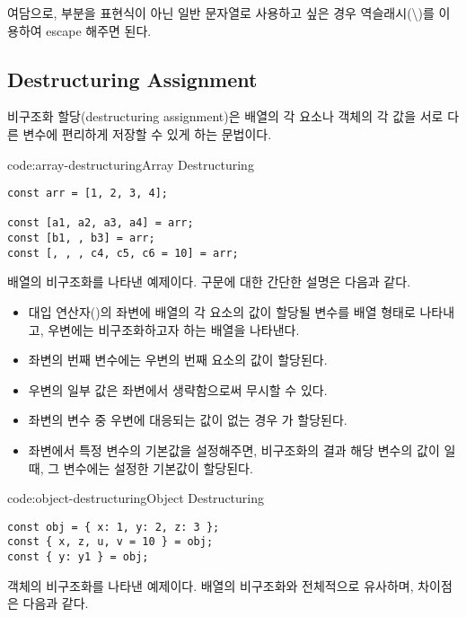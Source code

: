 여담으로, \cd{\$\{\}} 부분을 표현식이 아닌 일반 문자열로 사용하고 싶은 경우 역슬래시(\cd\textbackslash)를 이용하여 escape 해주면 된다.
\clearpage

\subsection*{Destructuring Assignment}

비구조화 할당(destructuring assignment)은 배열의 각 요소나 객체의 각 값을 서로 다른 변수에 편리하게 저장할 수 있게 하는 문법이다.

\begin{codeenv}{code:array-destructuring}{Array Destructuring}\begin{verbatim}
const arr = [1, 2, 3, 4];

const [a1, a2, a3, a4] = arr;
const [b1, , b3] = arr;
const [, , , c4, c5, c6 = 10] = arr;
\end{verbatim}
\end{codeenv}

\은 배열의 비구조화를 나타낸 예제이다. 구문에 대한 간단한 설명은 다음과 같다.

\begin{itemize}
    \item 대입 연산자(\cd{=})의 좌변에 배열의 각 요소의 값이 할당될 변수를 배열 형태로 나타내고, 우변에는 비구조화하고자 하는 배열을 나타낸다.
    \item 좌변의 번째 변수에는 우변의 번째 요소의 값이 할당된다.
    \item 우변의 일부 값은 좌변에서 생략함으로써 무시할 수 있다.
    \item 좌변의 변수 중 우변에 대응되는 값이 없는 경우 가 할당된다.
    \item 좌변에서 특정 변수의 기본값을 설정해주면, 비구조화의 결과 해당 변수의 값이 일 때, 그 변수에는 설정한 기본값이 할당된다.
\end{itemize}

\begin{codeenv}{code:object-destructuring}{Object Destructuring}\begin{verbatim}
const obj = { x: 1, y: 2, z: 3 };
const { x, z, u, v = 10 } = obj;
const { y: y1 } = obj;
\end{verbatim}
\end{codeenv}

\은 객체의 비구조화를 나타낸 예제이다. 배열의 비구조화와 전체적으로 유사하며, 차이점은 다음과 같다.

